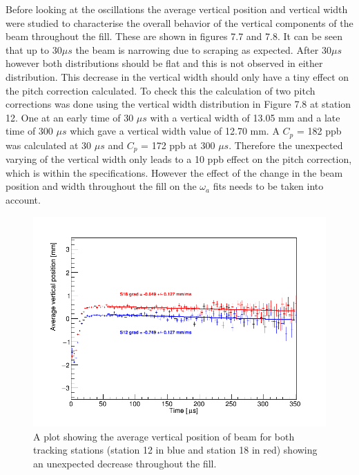 Before looking at the oscillations the average vertical position and vertical width were studied to characterise the overall behavior of the vertical components of the beam throughout the fill. These are shown in figures 7.7 and 7.8. It can be seen that up to 30$\mu{s}$ the beam is narrowing due to scraping as expected. After 30$\mu{s}$ however both distributions should be flat and this is not observed in either distribution. This decrease in the vertical width should only have a tiny effect on the pitch correction calculated. To check this the calculation of two pitch corrections was done using the vertical width distribution in Figure 7.8 at station 12. One at an early time of 30 $\mu{s}$ with a vertical width of 13.05 mm and a late time of 300 $\mu{s}$ which gave a vertical width value of 12.70 mm. A $C_p$ = 182 ppb was calculated at 30 $\mu{s}$ and  $C_p$ = 172 ppb at 300 $\mu{s}$. Therefore the unexpected varying of the vertical width only leads to a 10 ppb effect on the pitch correction, which is within the specifications. However the effect of the change in the beam position and width throughout the fill on the $\omega_{a}$ fits needs to be taken into account.

\begin{figure}[!h]
\centering 
\includegraphics[scale=0.5]{Figures/AverageVerticalPosition_rebinMeanPeriod_both.png}
\decoRule
\caption{A plot showing the average vertical position of beam for both tracking stations (station 12 in blue and station 18 in red) showing an unexpected decrease throughout the fill.}
\label{fig:AverageVerticalPosition_rebinMeanPeriod_both.png}
\end{figure}

